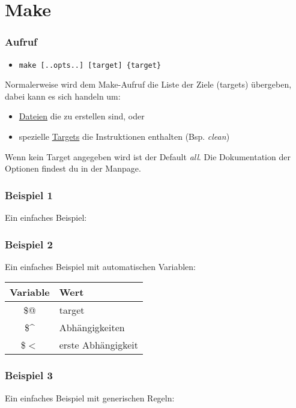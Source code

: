 \section{Make}
\begin{frame}
	\frametitle{Aufruf}
    \begin{itemize}
      \item<2->[] \texttt{make [..opts..] [target] \{target\}} 
    \end{itemize}
    Normalerweise wird dem Make-Aufruf die Liste der Ziele (targets) übergeben, dabei kann es sich handeln um:
    \begin{itemize}
      \item<3-> \underline{Dateien} die zu erstellen sind, oder
      \item<4-> spezielle \underline{Targets} die Instruktionen enthalten (Bsp. \textit{clean})
    \end{itemize}
    Wenn kein Target angegeben wird ist der Default \textit{all}.
    Die Dokumentation der Optionen findest du in der Manpage.
\end{frame}

\begin{frame}
	\frametitle{Beispiel 1}
    Ein einfaches Beispiel:
      
\end{frame}

\begin{frame}
	\frametitle{Beispiel 2}
    Ein einfaches Beispiel mit automatischen Variablen:
      
\begin{tabular}{|c|l|}
\hline
 Variable & Wert \\ \hline \hline
 \$@ & target \\ \hline 
 \$\^ & Abhängigkeiten \\ \hline
 \$$<$ & erste Abhängigkeit \\ \hline

\end{tabular}
\end{frame}

\begin{frame}
	\frametitle{Beispiel 3}
    Ein einfaches Beispiel mit generischen Regeln:
      
\end{frame}